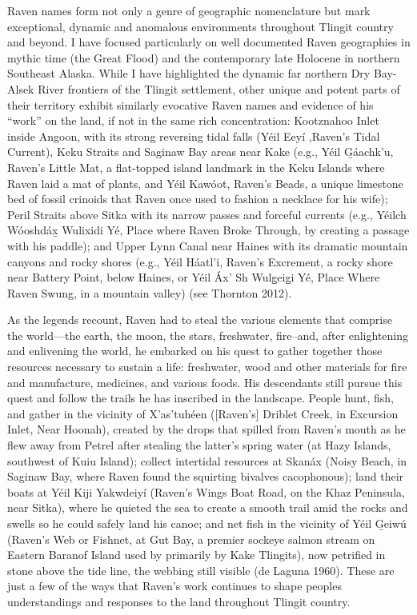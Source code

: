 Raven names form not only a genre of geographic nomenclature but mark exceptional, dynamic and anomalous environments throughout Tlingit country and beyond.  I have focused particularly on well documented Raven geographies in mythic time (the Great Flood) and the contemporary late Holocene in northern Southeast Alaska.  While I have highlighted the dynamic far northern Dry Bay-Alsek River frontiers of the Tlingit settlement, other unique and potent parts of their territory exhibit similarly evocative Raven names and evidence of his “work” on the land,  if not in the same rich concentration: Kootznahoo Inlet inside Angoon, with its strong reversing tidal falls (Yéil Eeyí ,Raven’s Tidal Current), Keku Straits and Saginaw Bay areas near Kake (e.g., Yéil G̲áachk'u, Raven’s Little Mat, a flat-topped island landmark in the Keku Islands where Raven laid a mat of plants, and Yéil Kawóot, Raven’s Beads, a unique limestone bed of fossil crinoids that Raven once used to fashion a necklace for his wife); Peril Straits above Sitka with its narrow passes and forceful currents (e.g., Yéilch Wóoshdáx̲ Wulixidi Yé, Place where Raven Broke Through, by creating a passage with his paddle); and Upper Lynn Canal near Haines with its dramatic mountain canyons and rocky shores (e.g., Yéil Háatl'i, Raven’s Excrement, a rocky shore near Battery Point, below Haines, or Yéil Áx' Sh Wulg̲eig̲i Yé, Place Where Raven Swung, in a mountain valley) (see Thornton 2012).

As the legends recount, Raven had to steal the various elements that comprise the world—the earth, the moon, the stars, freshwater, fire--and, after enlightening and enlivening the world, he embarked on his quest to gather together those resources necessary to sustain a life: freshwater, wood and other materials for fire and manufacture, medicines, and various foods. His descendants still pursue this quest and follow the trails he has inscribed in the landscape. People hunt, fish, and gather in the vicinity of X’as’tuhéen ([Raven’s] Driblet Creek, in Excursion Inlet, Near Hoonah), created by the drops that spilled from Raven’s mouth as he flew away from Petrel after stealing the latter’s spring water (at Hazy Islands, southwest of Kuiu Island); collect intertidal resources at Skanáx (Noisy Beach, in Saginaw Bay, where Raven found the squirting bivalves cacophonous); land their boats at Yéil Kiji Yakwdeiyí (Raven’s Wings Boat Road, on the Khaz Peninsula, near Sitka), where he quieted the sea to create a smooth trail amid the rocks and swells so he could safely land his canoe; and net fish in the vicinity of Yéil G̲eiwú (Raven’s Web or Fishnet, at Gut Bay, a premier sockeye salmon stream on Eastern Baranof Island used by primarily by Kake Tlingits), now petrified in stone above the tide line, the webbing still visible (de Laguna 1960). These are just a few of the ways that Raven’s work continues to shape peoples understandings and responses to the land throughout Tlingit country.

